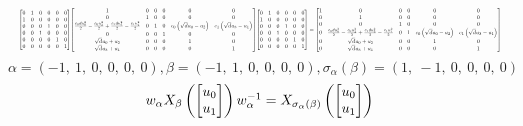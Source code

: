 \documentclass[11pt]{article}
\theoremstyle{definition}
\begin{document}
\[
\scaletoalign{\textwidth}{{\left[\begin{matrix}0 & 1 & 0 & 0 & 0 & 0\\1 & 0 & 0 & 0 & 0 & 0\\0 & 0 & 0 & 1 & 0 & 0\\0 & 0 & 1 & 0 & 0 & 0\\0 & 0 & 0 & 0 & 1 & 0\\0 & 0 & 0 & 0 & 0 & 1\end{matrix}\right]} {\left[\begin{matrix}1 & 0 & 0 & 0 & 0 & 0\\0 & 1 & 0 & 0 & 0 & 0\\\frac{c_{0} d u_{0}^{2}}{2} - \frac{c_{0} u_{2}^{2}}{2} + \frac{c_{1} d u_{3}^{2}}{2} - \frac{c_{1} u_{1}^{2}}{2} & 0 & 1 & 0 & c_{0} \left(\sqrt{d} u_{0} - u_{2}\right) & c_{1} \left(\sqrt{d} u_{3} - u_{1}\right)\\0 & 0 & 0 & 1 & 0 & 0\\\sqrt{d} u_{0} + u_{2} & 0 & 0 & 0 & 1 & 0\\\sqrt{d} u_{3} + u_{1} & 0 & 0 & 0 & 0 & 1\end{matrix}\right]} {\left[\begin{matrix}0 & 1 & 0 & 0 & 0 & 0\\1 & 0 & 0 & 0 & 0 & 0\\0 & 0 & 0 & 1 & 0 & 0\\0 & 0 & 1 & 0 & 0 & 0\\0 & 0 & 0 & 0 & 1 & 0\\0 & 0 & 0 & 0 & 0 & 1\end{matrix}\right]} = {\left[\begin{matrix}1 & 0 & 0 & 0 & 0 & 0\\0 & 1 & 0 & 0 & 0 & 0\\0 & 0 & 1 & 0 & 0 & 0\\0 & \frac{c_{0} d u_{0}^{2}}{2} - \frac{c_{0} u_{2}^{2}}{2} + \frac{c_{1} d u_{3}^{2}}{2} - \frac{c_{1} u_{1}^{2}}{2} & 0 & 1 & c_{0} \left(\sqrt{d} u_{0} - u_{2}\right) & c_{1} \left(\sqrt{d} u_{3} - u_{1}\right)\\0 & \sqrt{d} u_{0} + u_{2} & 0 & 0 & 1 & 0\\0 & \sqrt{d} u_{3} + u_{1} & 0 & 0 & 0 & 1\end{matrix}\right]}}
\]
\[
\alpha = \left( -1, \  1, \  0, \  0, \  0, \  0\right), \beta = \left( -1, \  1, \  0, \  0, \  0, \  0\right), \sigma_{\alpha}(\beta) = \left( 1, \  -1, \  0, \  0, \  0, \  0\right)
\]
\[
\scaletoalign{\textwidth}{w_{\alpha} X_{\beta}\left(\left[\begin{matrix}u_{0}\\u_{1}\end{matrix}\right]\right) w_{\alpha}^{-1} = X_{\sigma_{\alpha}\left(\beta\right)}\left(\left[\begin{matrix}u_{0}\\u_{1}\end{matrix}\right]\right)}
\]
\end{document}
